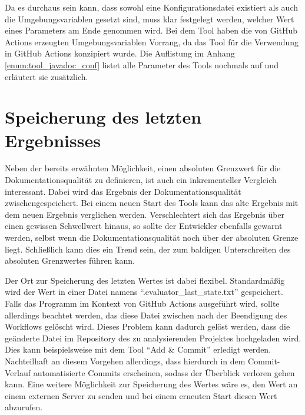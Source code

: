 Da es durchaus sein kann, dass sowohl eine Konfigurationsdatei existiert als auch die Umgebungsvariablen gesetzt sind, muss klar festgelegt werden, welcher Wert eines Parameters am Ende genommen wird. Bei dem Tool haben die von GitHub Actions erzeugten Umgebungsvariablen  Vorrang, da das Tool für die Verwendung in GitHub Actions konzipiert wurde.  Die Auflistung im Anhang \ref{enum:tool_javadoc_conf} listet alle Parameter des Tools nochmals auf und erläutert sie zusätzlich. 

\begin{comment}
Das Tool \textit{create\_conf}, das im Hauptverzeichnis im GitHub-Repository liegt kann eine beispielhafte Konfigurationsdatei erstellen, indem \textit{node create\_conf.js --out PATH --type json} aufgerufen wird. Dabei ist \textit{PATH} ein Pfad ohne Dateiname. Dieses Hilfstool legt dann eine Konfigurationsdatei namens \enquote{comment\_conf.json} in dem angegebenen Verzeichnis an. 
\end{comment}
\section{Speicherung des letzten Ergebnisses}\label{chapter:saving}
Neben der bereits erwähnten Möglichkeit, einen absoluten Grenzwert für die Dokumentationsqualität zu definieren, ist auch ein inkrementeller Vergleich interessant. Dabei wird das Ergebnis der Dokumentationsqualität zwischengespeichert. Bei einem neuen Start des Tools kann das alte Ergebnis mit dem neuen Ergebnis verglichen werden. Verschlechtert sich das Ergebnis über einen gewissen Schwellwert hinaus, so sollte der Entwickler ebenfalls gewarnt werden, selbst wenn die Dokumentationsqualität noch über der absoluten Grenze liegt. Schließlich kann dies ein Trend sein, der zum baldigen Unterschreiten des absoluten Grenzwertes führen kann. 

Der Ort zur Speicherung des letzten Wertes ist dabei flexibel. Standardmäßig wird der Wert in einer Datei namens \enquote{.evaluator\_last\_state.txt} gespeichert. Falls das Programm im Kontext von GitHub Actions ausgeführt wird, sollte allerdings beachtet werden, das diese Datei zwischen nach der Beendigung des Workflows gelöscht wird. Dieses Problem kann dadurch gelöst werden, dass die geänderte Datei im Repository des zu analysierenden Projektes hochgeladen wird. Dies kann beispielsweise mit dem Tool \enquote{Add \& Commit} \cite{add_commit} erledigt werden. Nachteilhaft an diesem Vorgehen allerdings, dass hierdurch in dem Commit-Verlauf automatisierte Commits erscheinen, sodass der Überblick verloren gehen kann.  Eine weitere Möglichkeit zur Speicherung des Wertes wäre es, den Wert an einem externen Server zu senden und bei einem erneuten Start diesen Wert abzurufen. 

